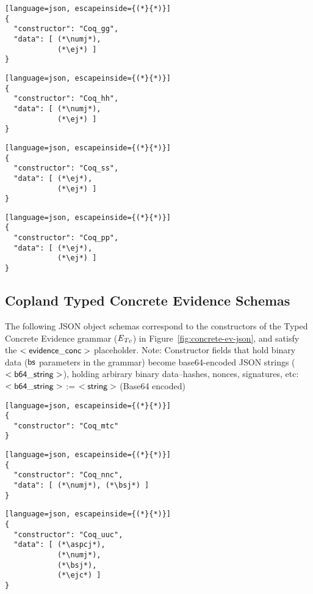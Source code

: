 \begin{lstlisting}[language=json, escapeinside={(*}{*)}]
{
  "constructor": "Coq_gg",
  "data": [ (*\numj*),
            (*\ej*) ]
}
\end{lstlisting}

\begin{lstlisting}[language=json, escapeinside={(*}{*)}]
{
  "constructor": "Coq_hh",
  "data": [ (*\numj*),
            (*\ej*) ]
}
\end{lstlisting}

\begin{lstlisting}[language=json, escapeinside={(*}{*)}]
{
  "constructor": "Coq_ss",
  "data": [ (*\ej*),
            (*\ej*) ]
}
\end{lstlisting}

\begin{lstlisting}[language=json, escapeinside={(*}{*)}]
{
  "constructor": "Coq_pp",
  "data": [ (*\ej*),
            (*\ej*) ]
}
\end{lstlisting}


\subsection{Copland Typed Concrete Evidence Schemas}
The following JSON object schemas correspond to the constructors of
the Typed Concrete Evidence grammar ($\mathsf{\emph{E}_\emph{T}}_{c}$) in
Figure~\ref{fig:concrete-ev-json}, and satisfy the $\mathsf{<evidence\_conc>}$ placeholder.
Note: Constructor fields that hold binary data ($\mathsf{bs}$ parameters
in the grammar) become base64-encoded JSON strings ($\mathsf{<b64\_string>}$), holding arbirary
binary data--hashes, nonces, signatures, etc: \\

\noindent $\mathsf{<b64\_string>}$ := $\mathsf{<string>}$ (Base64 encoded) \\

\begin{lstlisting}[language=json, escapeinside={(*}{*)}]
{
  "constructor": "Coq_mtc"
}
\end{lstlisting}

\begin{lstlisting}[language=json, escapeinside={(*}{*)}]
{
  "constructor": "Coq_nnc",
  "data": [ (*\numj*), (*\bsj*) ]
}
\end{lstlisting}

\begin{lstlisting}[language=json, escapeinside={(*}{*)}]
{
  "constructor": "Coq_uuc",
  "data": [ (*\aspcj*),
            (*\numj*),
            (*\bsj*),
            (*\ejc*) ]
}
\end{lstlisting}


